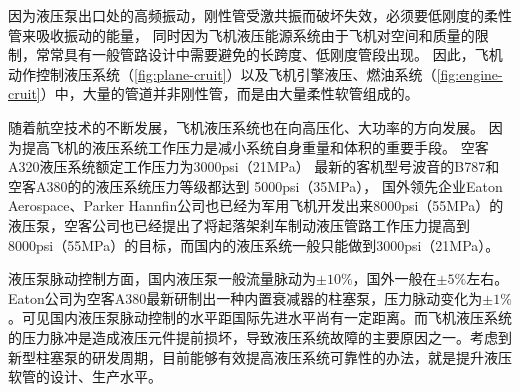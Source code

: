 因为液压泵出口处的高频振动，刚性管受激共振而破坏失效，必须要低刚度的柔性管来吸收振动的能量，
同时因为飞机液压能源系统由于飞机对空间和质量的限制，常常具有一般管路设计中需要避免的长跨度、低刚度管段出现\cite{gaofeng2013}。
因此，飞机动作控制液压系统（\ref{fig:plane-cruit}）以及飞机引擎液压、燃油系统（\ref{fig:engine-cruit}）中，大量的管道并非刚性管，而是由大量柔性软管组成的。


随着航空技术的不断发展，飞机液压系统也在向高压化、大功率的方向发展。
因为提高飞机的液压系统工作压力是减小系统自身重量和体积的重要手段。
空客A320液压系统额定工作压力为3000psi（21MPa）
最新的客机型号波音的B787和空客A380的的液压系统压力等级都达到 5000psi（35MPa）\cite{lavooij1991}，
国外领先企业Eaton Aerospace、Parker Hannfin公司也已经为军用飞机开发出来8000psi（55MPa）的液压泵，空客公司也已经提出了将起落架刹车制动液压管路工作压力提高到8000psi（55MPa）的目标，而国内的液压系统一般只能做到3000psi（21MPa）。


\begin{figure}
	\centering
	\hspace{1cm}
	\label{fig:plane-hose}
\end{figure}





液压泵脉动控制方面，国内液压泵一般流量脉动为$\pm10\%$，国外一般在$ \pm5\% $左右\cite{lijun2007}。Eaton公司为空客A380最新研制出一种内置衰减器的柱塞泵，压力脉动变化为$ \pm 1\%$。可见国内液压泵脉动控制的水平距国际先进水平尚有一定距离。而飞机液压系统的压力脉冲是造成液压元件提前损坏，导致液压系统故障的主要原因之一。考虑到新型柱塞泵的研发周期，目前能够有效提高液压系统可靠性的办法，就是提升液压软管的设计、生产水平。

